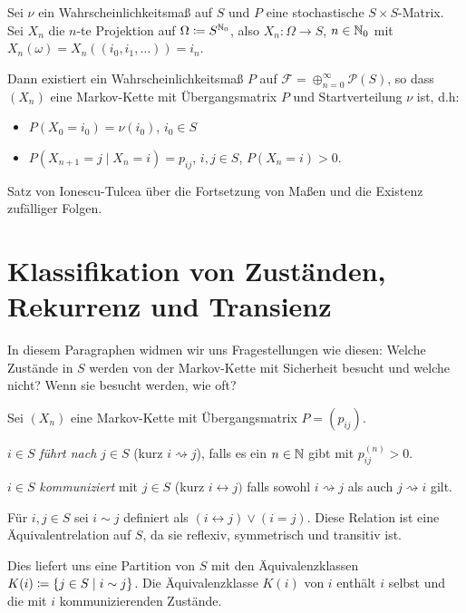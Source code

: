 \documentclass[a4paper,twoside,DIV15,BCOR12mm]{scrbook}
\newcommand{\cF}{\mathcal{F}}
\begin{document}
\begin{satz}
Sei $\nu$ ein Wahrscheinlichkeitsmaß auf $S$ und $P$ eine stochastische $S\times S$-Matrix. Sei $X_n$ die $n$-te Projektion auf $\Omega \da S^{\MdN_0}$, also $X_n : \Omega\to S$, $n\in\mathbb{N}_0$ mit $X_n(\omega) = X_n( (i_0,i_1,\ldots) ) = i_n$.

Dann existiert ein Wahrscheinlichkeitsmaß $P$ auf $\cF = \oplus_{n=0}^\infty \mathcal P (S)$, so dass $(X_n)$ eine Markov-Kette mit Übergangsmatrix $P$ und Startverteilung $\nu$ ist, d.h:
\begin{itemize}
\item $P(X_0 = i_0)= \nu(i_0)$, $i_0\in S$
\item $P(X_{n+1} = j \mid X_n= i) = p_{ij}$, $i,j\in S$, $P(X_n=i)>0$.
\end{itemize}
\end{satz}

\begin{beweis}
Satz von Ionescu-Tulcea über die Fortsetzung von Maßen und die Existenz zufälliger Folgen.
\end{beweis}

\section{Klassifikation von Zuständen, Rekurrenz und Transienz}

In diesem Paragraphen widmen wir uns Fragestellungen wie diesen:
Welche Zustände in $S$ werden von der Markov-Kette mit Sicherheit besucht und welche nicht? Wenn sie besucht werden, wie oft? 

\begin{definition}
Sei $(X_n)$ eine Markov-Kette mit Übergangsmatrix $P=(p_{ij})$.
\begin{enuma}
\item $i\in S$ \emph{führt nach} $j\in S$ (kurz $i\rightsquigarrow j$)\index{$\rightsquigarrow$}, falls es ein $n\in \mathbb{N}$ gibt mit $p_{ij}^{(n)}>0$.

\item $i\in S$ \emph{kommuniziert} mit $j\in S$ (kurz $i\leftrightarrow j)$\index{$\leftrightarrow$} falls sowohl $i\rightsquigarrow j$ als auch $j\rightsquigarrow i$ gilt.
\end{enuma}
\end{definition}

\begin{bemerkung}
Für $i,j\in S$ sei $i\sim j$ definiert als $(i\leftrightarrow j) \vee (i=j)$. Diese Relation ist eine Äquivalentrelation auf $S$, da sie reflexiv, symmetrisch und transitiv ist.

Dies liefert uns eine Partition von $S$ mit den Äquivalenzklassen $K(i) \da \{j\in S \mid i\sim j\}$. Die Äquivalenzklasse $K(i)$ von $i$ enthält $i$ selbst und die mit $i$ kommunizierenden Zustände.
\end{bemerkung}
\end{document}
